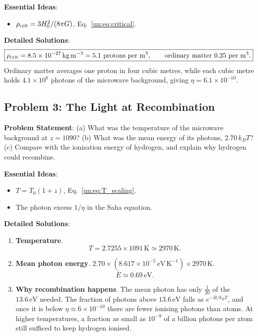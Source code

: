 \textbf{Essential Ideas}:
\begin{itemize}
	\item $\rho_{\rm crit}=3H_0^2/(8\pi G)$, Eq.~\eqref{un:eq:critical}.
\end{itemize}

\textbf{Detailed Solutions}:
\[
\boxed{\rho_{\rm crit}=8.5\times10^{-27}\,\mathrm{kg\,m^{-3}}=5.1\ \text{protons per m}^3,\qquad \text{ordinary matter}\ 0.25\ \text{per m}^3.}
\]
Ordinary matter averages one proton in four cubic metres, while each cubic metre holds $4.1\times10^8$ photons of the microwave background, giving $\eta=6.1\times10^{-10}$.

\subsection{Problem 3: The Light at Recombination}
\label{un:prob:cmb}

\textbf{Problem Statement}: (a) What was the temperature of the microwave background at $z=1090$? (b) What was the mean energy of its photons, $2.70\,k_BT$? (c) Compare with the ionisation energy of hydrogen, and explain why hydrogen could recombine.

\textbf{Essential Ideas}:
\begin{itemize}
	\item $T=T_0(1+z)$, Eq.~\eqref{un:eq:T_scaling}.
	\item The photon excess $1/\eta$ in the Saha equation.
\end{itemize}

\textbf{Detailed Solutions}:
\begin{enumerate}[label=(\alph*)]
	\item \textbf{Temperature}.
	\[
	\boxed{T=2.7255\times1091\,\mathrm K\simeq2970\,\mathrm K.}
	\]
	\item \textbf{Mean photon energy}. $2.70\times(8.617\times10^{-5}\,\mathrm{eV\,K^{-1}})\times2970\,\mathrm K$.
	\[
	\boxed{\bar E\simeq0.69\,\mathrm{eV}.}
	\]
	\item \textbf{Why recombination happens}. The mean photon has only $\tfrac{1}{20}$ of the $13.6\,\mathrm{eV}$ needed. The fraction of photons above $13.6\,\mathrm{eV}$ falls as $e^{-B/k_BT}$, and once it is below $\eta\approx6\times10^{-10}$ there are fewer ionising photons than atoms. At higher temperatures, a fraction as small as $10^{-9}$ of a billion photons per atom still sufficed to keep hydrogen ionised.
\end{enumerate}

